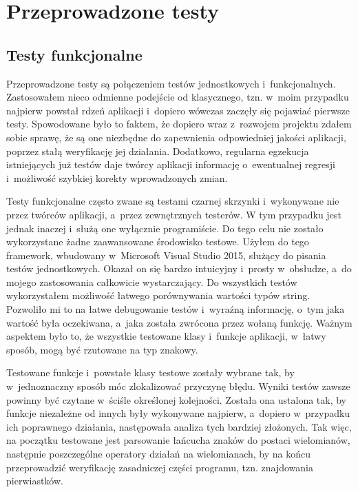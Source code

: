 \chapter{Przeprowadzone testy}

\section{Testy funkcjonalne}

Przeprowadzone testy są połączeniem testów jednostkowych i~funkcjonalnych. Zastosowałem nieco odmienne podejście od klasycznego, tzn. w~moim przypadku najpierw powstał rdzeń aplikacji i~dopiero wówczas zaczęły się pojawiać pierwsze testy. Spowodowane było to faktem, że dopiero wraz z~rozwojem projektu zdałem sobie sprawę, że są one niezbędne do zapewnienia odpowiedniej jakości aplikacji, poprzez stałą weryfikację jej działania. Dodatkowo, regularna egzekucja istniejących już testów daje twórcy aplikacji informację o~ewentualnej regresji i~możliwość szybkiej korekty wprowadzonych zmian.

Testy funkcjonalne często zwane są testami czarnej skrzynki i~wykonywane nie przez twórców aplikacji, a~przez zewnętrznych testerów. W tym przypadku jest jednak inaczej i~służą one wyłącznie programiście. Do tego celu nie zostało wykorzystane żadne zaawansowane środowisko testowe. Użyłem do tego framework, wbudowany w~Microsoft Visual Studio 2015, służący do pisania testów jednostkowych. Okazał on się bardzo intuicyjny i~prosty w~obsłudze, a~do mojego zastosowania całkowicie wystarczający. Do wszystkich testów wykorzystałem możliwość łatwego porównywania wartości typów string. Pozwoliło mi to na łatwe debugowanie testów i~wyraźną informację, o~tym jaka wartość była oczekiwana, a~jaka została zwrócona przez wołaną funkcję. Ważnym aspektem było to, że wszystkie testowane klasy i~funkcje aplikacji, w~łatwy sposób, mogą być rzutowane na typ znakowy.

Testowane funkcje i~powstałe klasy testowe zostały wybrane tak, by w~jednoznaczny sposób móc zlokalizować przyczynę błędu. Wyniki testów zawsze powinny być czytane w~ściśle określonej kolejności. Została ona ustalona tak, by funkcje niezależne od innych były wykonywane najpierw, a~dopiero w~przypadku ich poprawnego działania, następowała analiza tych bardziej złożonych. Tak więc, na początku testowane jest parsowanie łańcucha znaków do postaci wielomianów, następnie poszczególne operatory działań na wielomianach, by na końcu przeprowadzić weryfikację zasadniczej części programu, tzn. znajdowania pierwiastków.

